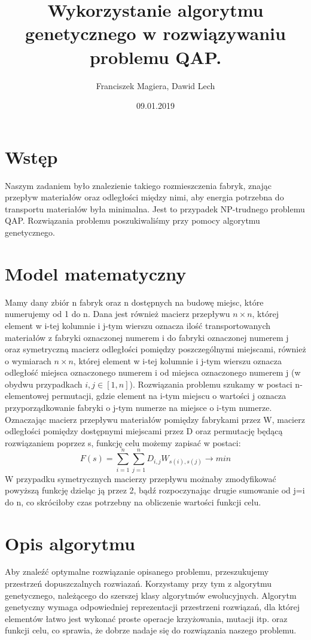 \documentclass[12pt]{article}
\author{Franciszek Magiera, Dawid Lech}
\title{Wykorzystanie algorytmu genetycznego w rozwiązywaniu problemu QAP.}
\date{09.01.2019}
\begin{document}
\maketitle
\newpage
\tableofcontents
\newpage
\section{Wstęp}
Naszym zadaniem było znalezienie takiego rozmieszczenia fabryk, znając przepływ materiałów oraz odległości między nimi, aby energia potrzebna do transportu materiałów była minimalna. Jest to przypadek NP-trudnego problemu QAP. Rozwiązania problemu poszukiwaliśmy przy pomocy algorytmu genetycznego.
\section{Model matematyczny}
Mamy dany zbiór n fabryk oraz n dostępnych na budowę miejsc, które numerujemy od 1 do n. Dana jest również macierz przepływu $n\times n$, której element w i-tej kolumnie i j-tym wierszu oznacza ilość transportowanych materiałów z fabryki oznaczonej numerem i do fabryki oznaczonej numerem j oraz symetryczną macierz odległości pomiędzy poszczególnymi miejscami, również o wymiarach $n\times n$, której element w i-tej kolumnie i j-tym wierszu oznacza odległość miejsca oznaczonego numerem i od miejsca oznaczonego numerem j (w obydwu przypadkach $i,j \in [1,n]$). Rozwiązania problemu szukamy w postaci n-elementowej permutacji, gdzie element na i-tym miejscu o wartości j oznacza przyporządkowanie fabryki o j-tym numerze na miejsce o i-tym numerze. Oznaczając macierz przepływu materiałów pomiędzy fabrykami przez W, macierz odległości pomiędzy dostępnymi miejscami przez D oraz permutację będącą rozwiązaniem poprzez s, funkcję celu możemy zapisać w postaci:
\begin{equation}
F(s) = \sum_{i=1}^{n}  \sum_{j=1}^{n}D_{i,j}W_{s(i), s(j)} \longrightarrow min \label{Funkcja celu}
\end{equation}
W przypadku symetrycznych macierzy przepływu możnaby zmodyfikować powyższą funkcję dzieląc ją przez 2, bądź rozpoczynając drugie sumowanie od j=i do n, co skróciłoby czas potrzebny na obliczenie wartości funkcji celu.
\section{Opis algorytmu}
Aby znaleźć optymalne rozwiązanie opisanego problemu, przeszukujemy przestrzeń dopuszczalnych rozwiazań. Korzystamy przy tym z algorytmu genetycznego, należącego do szerszej klasy algorytmów ewolucyjnych. Algorytm genetyczny wymaga odpowiedniej reprezentacji przestrzeni rozwiązań, dla której elementów łatwo jest wykonać proste operacje krzyżowania, mutacji itp. oraz funkcji celu, co sprawia, że dobrze nadaje się do rozwiązania naszego problemu.
\end{document}

